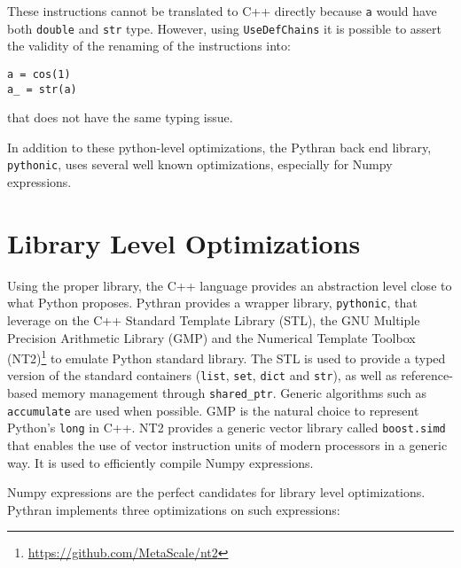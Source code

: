 \documentclass[10pt, onecolumn, preprint]{sigplanconf}
\begin{document}
These instructions cannot be translated to C++ directly because \texttt{a}
would have both \texttt{double} and \texttt{str} type. However, using
\texttt{UseDefChains} it is possible to assert the validity of the renaming of
the instructions into:


\begin{lstlisting}
a = cos(1)
a_ = str(a)
\end{lstlisting}

that does not have the same typing issue.

In addition to these python-level optimizations, the Pythran back end library,
\texttt{pythonic}, uses several well known optimizations, especially for Numpy
expressions.

\section{Library Level Optimizations}
\label{sec:backend}

Using the proper library, the C++ language provides an abstraction level close
to what Python proposes. Pythran provides a wrapper library, \texttt{pythonic},
that leverage on the C++ Standard Template Library (STL), the GNU Multiple
Precision Arithmetic Library (GMP) and the Numerical Template Toolbox
(NT2)\footnote{\url{https://github.com/MetaScale/nt2}} to emulate Python
standard library. The STL is used to provide a typed version of the standard
containers (\texttt{list}, \texttt{set}, \texttt{dict} and \texttt{str}), as
well as reference-based memory management through \texttt{shared\_ptr}. Generic
algorithms such as \texttt{accumulate} are used when possible. GMP is the
natural choice to represent Python's \texttt{long} in C++. NT2 provides a generic
vector library called \texttt{boost.simd}\cite{esterie2012boost} that enables
the use of vector instruction units of modern processors in a generic way. It is used
to efficiently compile Numpy expressions.

Numpy expressions are the perfect candidates for library level optimizations.
Pythran implements three optimizations on such expressions:
\end{document}
